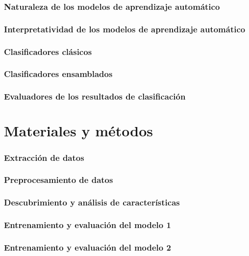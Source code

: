 \documentclass{article}
\theoremstyle{mytheoremstyle}
\theoremstyle{mytheoremstyle}
\theoremstyle{myproblemstyle}
\begin{document}
    \subsubsection{Naturaleza de los modelos de aprendizaje automático}
    \subsubsection{Interpretatividad de los modelos de aprendizaje automático}
    \subsubsection{Clasificadores clásicos}
    \subsubsection{Clasificadores ensamblados}
    \subsubsection{Evaluadores de los resultados de clasificación}

    
    

    \section{Materiales y métodos}

    \subsubsection{Extracción de datos}

    \subsubsection{Preprocesamiento de datos}
    \subsubsection{Descubrimiento y análisis de características}
    \subsubsection{Entrenamiento y evaluación del modelo 1}
    \subsubsection{Entrenamiento y evaluación del modelo 2}
\end{document}
